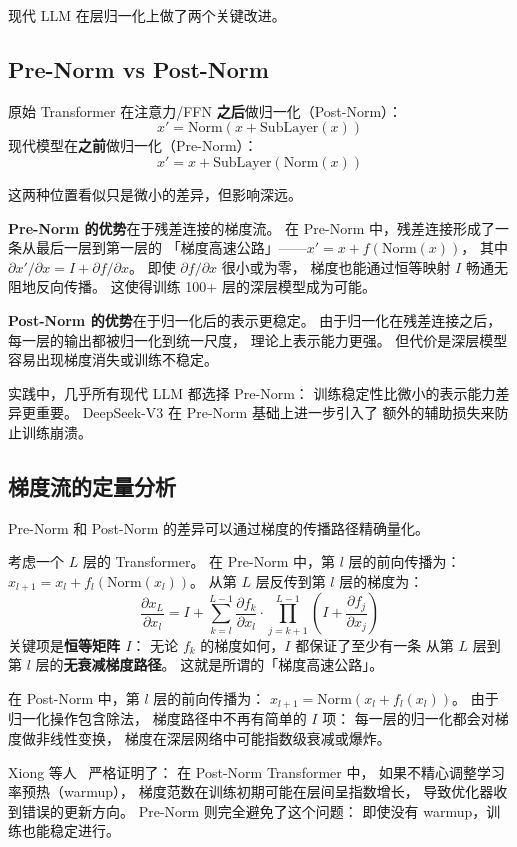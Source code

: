 现代 LLM 在层归一化上做了两个关键改进。

\subsection{Pre-Norm vs Post-Norm}

原始 Transformer 在注意力/FFN \textbf{之后}做归一化（Post-Norm）：
\[
  x' = \mathrm{Norm}(x + \mathrm{SubLayer}(x))
\]
现代模型在\textbf{之前}做归一化（Pre-Norm）：
\[
  x' = x + \mathrm{SubLayer}(\mathrm{Norm}(x))
\]

这两种位置看似只是微小的差异，但影响深远。

\textbf{Pre-Norm 的优势}在于残差连接的梯度流。
在 Pre-Norm 中，残差连接形成了一条从最后一层到第一层的
「梯度高速公路」——$x' = x + f(\mathrm{Norm}(x))$，
其中 $\partial x'/\partial x = I + \partial f / \partial x$。
即使 $\partial f / \partial x$ 很小或为零，
梯度也能通过恒等映射 $I$ 畅通无阻地反向传播。
这使得训练 100+ 层的深层模型成为可能。

\textbf{Post-Norm 的优势}在于归一化后的表示更稳定。
由于归一化在残差连接之后，
每一层的输出都被归一化到统一尺度，
理论上表示能力更强。
但代价是深层模型容易出现梯度消失或训练不稳定。

实践中，几乎所有现代 LLM 都选择 Pre-Norm：
训练稳定性比微小的表示能力差异更重要。
DeepSeek-V3 在 Pre-Norm 基础上进一步引入了
额外的辅助损失来防止训练崩溃。

\subsection{梯度流的定量分析}

Pre-Norm 和 Post-Norm 的差异可以通过梯度的传播路径精确量化。

考虑一个 $L$ 层的 Transformer。
在 Pre-Norm 中，第 $l$ 层的前向传播为：
$x_{l+1} = x_l + f_l(\mathrm{Norm}(x_l))$。
从第 $L$ 层反传到第 $l$ 层的梯度为：
\[
  \frac{\partial x_L}{\partial x_l} = I + \sum_{k=l}^{L-1}
  \frac{\partial f_k}{\partial x_l} \cdot \prod_{j=k+1}^{L-1}
  \left(I + \frac{\partial f_j}{\partial x_j}\right)
\]
关键项是\textbf{恒等矩阵 $I$}：
无论 $f_k$ 的梯度如何，$I$ 都保证了至少有一条
从第 $L$ 层到第 $l$ 层的\textbf{无衰减梯度路径}。
这就是所谓的「梯度高速公路」。

在 Post-Norm 中，第 $l$ 层的前向传播为：
$x_{l+1} = \mathrm{Norm}(x_l + f_l(x_l))$。
由于归一化操作包含除法，
梯度路径中不再有简单的 $I$ 项：
每一层的归一化都会对梯度做非线性变换，
梯度在深层网络中可能指数级衰减或爆炸。

Xiong 等人~\cite{xiong2020prenorm} 严格证明了：
在 Post-Norm Transformer 中，
如果不精心调整学习率预热（warmup），
梯度范数在训练初期可能在层间呈指数增长，
导致优化器收到错误的更新方向。
Pre-Norm 则完全避免了这个问题：
即使没有 warmup，训练也能稳定进行。

